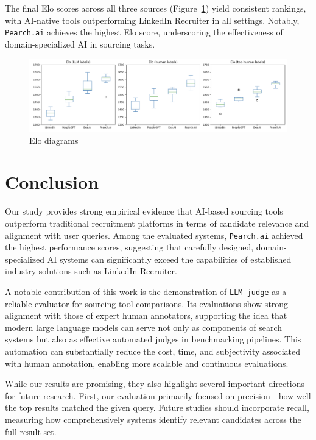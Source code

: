\documentclass{article}
\begin{document}
The final Elo scores across all three sources (Figure~\ref{fig:elo}) yield consistent rankings, with AI-native tools outperforming LinkedIn Recruiter in all settings. Notably, \texttt{Pearch.ai} achieves the highest Elo score, underscoring the effectiveness of domain-specialized AI in sourcing tasks.

\begin{figure}
\centering
\includegraphics[width=1\linewidth]{elo.png}
\caption{\label{fig:elo}Elo diagrams}
\end{figure}

\section{Conclusion}

Our study provides strong empirical evidence that AI-based sourcing tools outperform traditional recruitment platforms in terms of candidate relevance and alignment with user queries. Among the evaluated systems, \texttt{Pearch.ai} achieved the highest performance scores, suggesting that carefully designed, domain-specialized AI systems can significantly exceed the capabilities of established industry solutions such as LinkedIn Recruiter.

A notable contribution of this work is the demonstration of \texttt{LLM-judge} as a reliable evaluator for sourcing tool comparisons. Its evaluations show strong alignment with those of expert human annotators, supporting the idea that modern large language models can serve not only as components of search systems but also as effective automated judges in benchmarking pipelines. This automation can substantially reduce the cost, time, and subjectivity associated with human annotation, enabling more scalable and continuous evaluations.

While our results are promising, they also highlight several important directions for future research. First, our evaluation primarily focused on precision—how well the top results matched the given query. Future studies should incorporate recall, measuring how comprehensively systems identify relevant candidates across the full result set.
\end{document}

